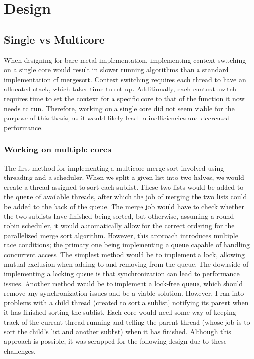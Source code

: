 \section{Design}\label{sec:Design}
\subsection{Single vs Multicore}
When designing for bare metal implementation, implementing context switching on
a single core would result in slower running algorithms than a standard
implementation of mergesort. Context switching requires each thread to have an
allocated stack, which takes time to set up. Additionally, each context switch
requires time to set the context for a specific core to that of the function it
now needs to run. Therefore, working on a single core did not seem viable for
the purpose of this thesis, as it would likely lead to inefficiencies and
decreased performance.

\subsubsection{Working on multiple cores}
The first method for implementing a multicore merge sort involved using
threading and a scheduler. When we split a given list into two halves, we would
create a thread assigned to sort each sublist. These two lists would be added to
the queue of available threads, after which the job of merging the two lists
could be added to the back of the queue. The merge job would have to check
whether the two sublists have finished being sorted, but otherwise, assuming a
round-robin scheduler, it would automatically allow for the correct ordering for
the parallelized merge sort algorithm. However, this approach introduces
multiple race conditions; the primary one being implementing a queue capable of
handling concurrent access. The simplest method would be to implement a lock,
allowing mutual exclusion when adding to and removing from the queue. The
downside of implementing a locking queue is that synchronization can lead to
performance issues. Another method would be to implement a lock-free queue,
which should remove any synchronization issues and be a viable solution.
However, I ran into problems with a child thread (created to sort a sublist)
notifying its parent when it has finished sorting the sublist. Each core would
need some way of keeping track of the current thread running and telling the
parent thread (whose job is to sort the child's list and another sublist) when
it has finished. Although this approach is possible, it was scrapped for the
following design due to these challenges.

